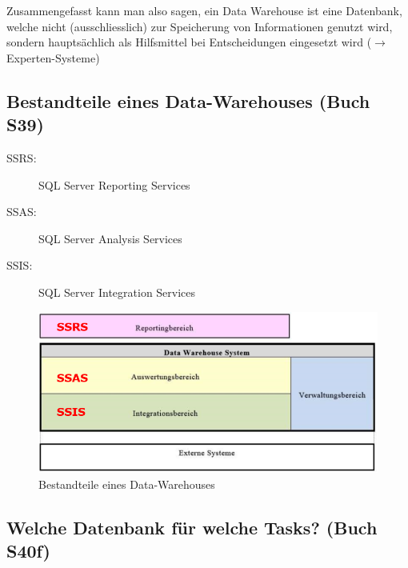 \documentclass[a4paper, 11pt]{article}
\begin{document}
Zusammengefasst kann man also sagen, ein Data Warehouse ist eine Datenbank, welche nicht (ausschliesslich) zur Speicherung von Informationen genutzt wird, sondern hauptsächlich als Hilfsmittel bei Entscheidungen eingesetzt wird ($\rightarrow$ Experten-Systeme)



\subsection{Bestandteile eines Data-Warehouses (Buch S39)}

\begin{description}
	\item [SSRS: ] SQL Server Reporting Services
	\item [SSAS: ] SQL Server Analysis Services
	\item [SSIS: ] SQL Server Integration Services
\end{description}

\begin{figure}[htb]
	\centering
	\includegraphics[keepaspectratio=true,height=18\baselineskip]{bestandteiledatawarehouse.PNG}
	\caption{Bestandteile eines Data-Warehouses}
	\label{fig:bstdw}
\end{figure}

\newpage

\subsection{Welche Datenbank für welche Tasks? (Buch S40f)}
\end{document}
